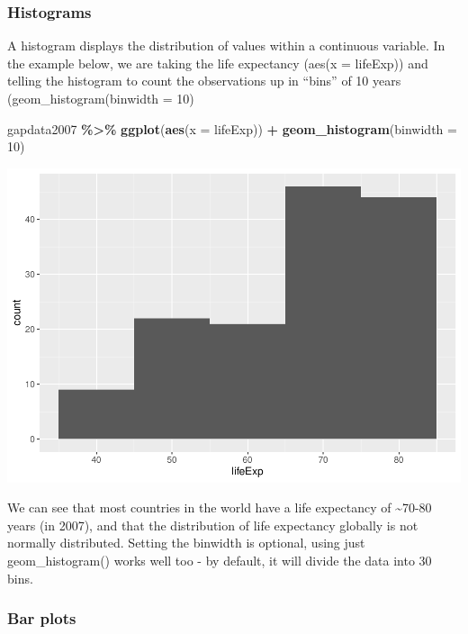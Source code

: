 \documentclass[
]{book}
\newenvironment{Shaded}{\begin{snugshade}}{\end{snugshade}}
\newcommand{\AttributeTok}[1]{\textcolor[rgb]{0.13,0.29,0.53}{#1}}
\newcommand{\DecValTok}[1]{\textcolor[rgb]{0.00,0.00,0.81}{#1}}
\newcommand{\FunctionTok}[1]{\textcolor[rgb]{0.13,0.29,0.53}{\textbf{#1}}}
\newcommand{\NormalTok}[1]{#1}
\newcommand{\SpecialCharTok}[1]{\textcolor[rgb]{0.81,0.36,0.00}{\textbf{#1}}}
\begin{document}
\subsubsection{Histograms}\label{histograms}

A histogram displays the distribution of values within a continuous variable.
In the example below, we are taking the life expectancy (aes(x = lifeExp))
and telling the histogram to count the observations up in ``bins'' of 10 years
(geom\_histogram(binwidth = 10)

\begin{Shaded}
\begin{Highlighting}[]
\NormalTok{gapdata2007 }\SpecialCharTok{\%\textgreater{}\%}
\FunctionTok{ggplot}\NormalTok{(}\FunctionTok{aes}\NormalTok{(}\AttributeTok{x =}\NormalTok{ lifeExp)) }\SpecialCharTok{+}
\FunctionTok{geom\_histogram}\NormalTok{(}\AttributeTok{binwidth =} \DecValTok{10}\NormalTok{)}
\end{Highlighting}
\end{Shaded}

\includegraphics{_main_files/figure-latex/unnamed-chunk-77-1.pdf}

We can see that most countries in the world have a life expectancy of \textasciitilde70-80
years (in 2007), and that the distribution of life expectancy globally is not normally distributed. Setting the binwidth is optional, using just geom\_histogram() works well too - by default, it will divide the data into 30 bins.

\subsubsection{Bar plots}\label{bar-plots}
\end{document}
